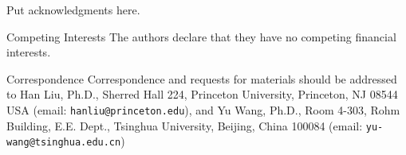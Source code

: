 \documentclass{nature}
\begin{document}





\begin{addendum}
 \item Put acknowledgments here.
 \item[Competing Interests] The authors declare that they have no
competing financial interests.
 \item[Correspondence] Correspondence and requests for materials should be
addressed to Han Liu, Ph.D., Sherred Hall 224, Princeton University, Princeton,
NJ 08544 USA (email: \texttt{hanliu@princeton.edu}), and Yu Wang, Ph.D., Room
4-303, Rohm Building, E.E. Dept., Tsinghua University, Beijing, China 100084
(email: \texttt{yu-wang@tsinghua.edu.cn})
\end{addendum}

	
\end{document}

